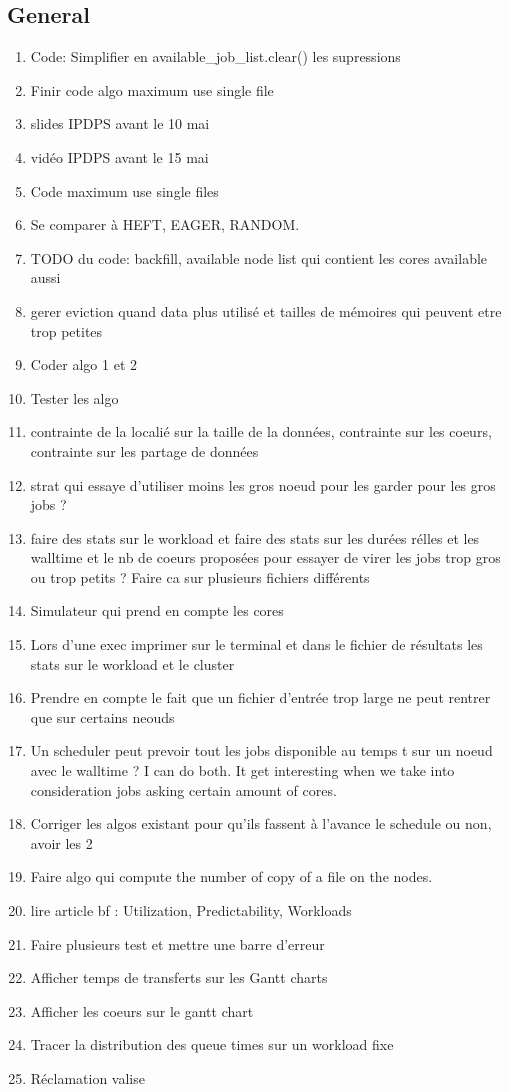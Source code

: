 \documentclass[a4paper]{article}
\begin{document}
	\subsection{General}
		\begin{enumerate}
			\item Code: Simplifier en available\_job\_list.clear() les supressions
			\item Finir code algo maximum use single file
			\item slides IPDPS avant le 10 mai
			\item vidéo IPDPS avant le 15 mai
			\item Code maximum use single files
			\item Se comparer à HEFT, EAGER, RANDOM.
			\item TODO du code: backfill, available node list qui contient les cores available aussi
			\item gerer eviction quand data plus utilisé et tailles de mémoires qui peuvent etre trop petites
			\item Coder algo 1 et 2
			\item Tester les algo
			\item contrainte de la localié sur la taille de la données, contrainte sur les coeurs, contrainte sur les partage de données
			\item strat qui essaye d'utiliser moins les gros noeud pour les garder pour les gros jobs ?
			\item faire des stats sur le workload et faire des stats sur les durées rélles et les walltime et le nb de coeurs proposées pour essayer de virer les jobs trop gros ou trop petits ? Faire ca sur plusieurs fichiers différents
			\item Simulateur qui prend en compte les cores
			\item Lors d'une exec imprimer sur le terminal et dans le fichier de résultats les stats sur le workload et le cluster
			\item Prendre en compte le fait que un fichier d'entrée trop large ne peut rentrer que sur certains neouds
			\item Un scheduler peut prevoir tout les jobs disponible au temps t sur un noeud avec le walltime ? I can do both. It get interesting when we take into consideration jobs asking certain amount of cores. 
			\item Corriger les algos existant pour qu'ils fassent à l'avance le schedule ou non, avoir les 2
			\item Faire algo qui compute the number of copy of a file on the nodes.
			\item lire article bf : Utilization, Predictability, Workloads
			\item Faire plusieurs test et mettre une barre d'erreur
			\item Afficher temps de transferts sur les Gantt charts
			\item Afficher les coeurs sur le gantt chart
			\item Tracer la distribution des queue times sur un workload fixe
			\item Réclamation valise
		\end{enumerate}
\end{document}

